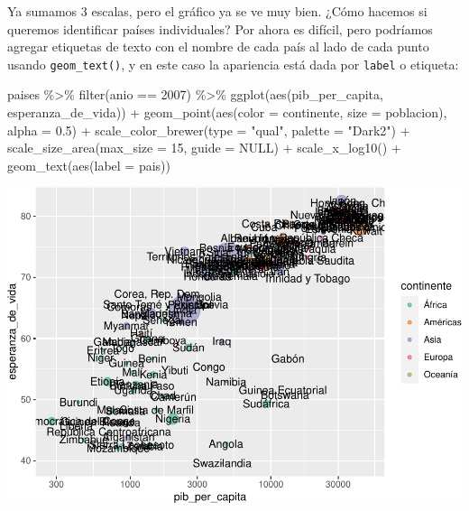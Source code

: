 \documentclass[
  openany]{book}
\newenvironment{Shaded}{\begin{snugshade}}{\end{snugshade}}
\newcommand{\AttributeTok}[1]{\textcolor[rgb]{0.77,0.63,0.00}{#1}}
\newcommand{\ConstantTok}[1]{\textcolor[rgb]{0.00,0.00,0.00}{#1}}
\newcommand{\DecValTok}[1]{\textcolor[rgb]{0.00,0.00,0.81}{#1}}
\newcommand{\FloatTok}[1]{\textcolor[rgb]{0.00,0.00,0.81}{#1}}
\newcommand{\FunctionTok}[1]{\textcolor[rgb]{0.00,0.00,0.00}{#1}}
\newcommand{\NormalTok}[1]{#1}
\newcommand{\SpecialCharTok}[1]{\textcolor[rgb]{0.00,0.00,0.00}{#1}}
\newcommand{\StringTok}[1]{\textcolor[rgb]{0.31,0.60,0.02}{#1}}
\begin{document}
Ya sumamos 3 escalas, pero el gráfico ya se ve muy bien.
¿Cómo hacemos si queremos identificar países individuales?
Por ahora es difícil, pero podríamos agregar etiquetas de texto con el nombre de cada país al lado de cada punto usando \texttt{geom\_text()}, y en este caso la apariencia está dada por \texttt{label} o etiqueta:

\begin{Shaded}
\begin{Highlighting}[]
\NormalTok{paises }\SpecialCharTok{\%\textgreater{}\%} 
  \FunctionTok{filter}\NormalTok{(anio }\SpecialCharTok{==} \DecValTok{2007}\NormalTok{) }\SpecialCharTok{\%\textgreater{}\%} 
  \FunctionTok{ggplot}\NormalTok{(}\FunctionTok{aes}\NormalTok{(pib\_per\_capita, esperanza\_de\_vida)) }\SpecialCharTok{+}
  \FunctionTok{geom\_point}\NormalTok{(}\FunctionTok{aes}\NormalTok{(}\AttributeTok{color =}\NormalTok{ continente, }\AttributeTok{size =}\NormalTok{ poblacion), }\AttributeTok{alpha =} \FloatTok{0.5}\NormalTok{) }\SpecialCharTok{+}
  \FunctionTok{scale\_color\_brewer}\NormalTok{(}\AttributeTok{type =} \StringTok{"qual"}\NormalTok{, }\AttributeTok{palette =} \StringTok{"Dark2"}\NormalTok{) }\SpecialCharTok{+}
  \FunctionTok{scale\_size\_area}\NormalTok{(}\AttributeTok{max\_size =} \DecValTok{15}\NormalTok{, }\AttributeTok{guide =} \ConstantTok{NULL}\NormalTok{) }\SpecialCharTok{+}
  \FunctionTok{scale\_x\_log10}\NormalTok{() }\SpecialCharTok{+}
  \FunctionTok{geom\_text}\NormalTok{(}\FunctionTok{aes}\NormalTok{(}\AttributeTok{label =}\NormalTok{ pais)) }
\end{Highlighting}
\end{Shaded}

\begin{center}\includegraphics[width=1\linewidth]{DT6_files/figure-latex/unnamed-chunk-135-1} \end{center}
\end{document}
